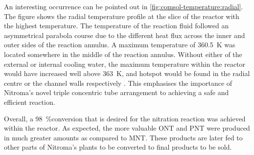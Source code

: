 An interesting occurrence can be pointed out in \cref{fig:comsol-temperature:radial}. The figure shows the radial temperature profile at the slice of the reactor with the highest temperature. The temperature of the reaction fluid followed an asymmetrical parabola course due to the different heat flux across the inner and outer sides of the reaction annulus. A maximum temperature of \approx \SI{360.5}{\K} was located somewhere in the middle of the reaction annulus. Without either of the external or internal cooling water, the maximum temperature within the reactor would have increased well above \SI{363}{\K}, and hotspot would be found in the radial centre or the channel walls respectively . This emphasises the importance of Nitroma's novel triple concentric tube arrangement to achieving a safe and efficient reaction.

Overall, a \SI{98}{\%}conversion that is desired for the nitration reaction was achieved within the reactor. As expected, the more valuable ONT and PNT were produced in much greater amounts as compared to MNT. These products are later fed to other parts of Nitroma's plants to be converted to final products to be sold.

